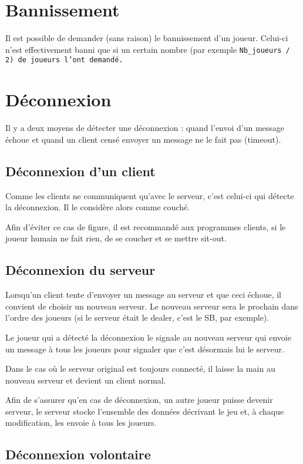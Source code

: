 \documentclass[a4paper]{article}
\begin{document}
\section{Bannissement}

Il est possible de demander (sans raison) le bannissement d'un joueur.
Celui-ci n'est effectivement banni que si un certain nombre (par exemple \tt Nb\_joueurs / 2\rm) de joueurs l'ont demandé.

\section{Déconnexion}

Il y a deux moyens de détecter une déconnexion : quand l'envoi d'un message échoue et quand un client censé envoyer un message ne le fait pas (timeout).

\subsection{Déconnexion d'un client}

Comme les clients ne communiquent qu'avec le serveur, c'est celui-ci qui détecte la déconnexion.
Il le considère alors comme couché.

Afin d'éviter ce cas de figure, il est recommandé aux programmes clients, si le joueur humain ne fait rien, de se coucher et se mettre sit-out.

\subsection{Déconnexion du serveur}

Lorsqu'un client tente d'envoyer un message au serveur et que ceci échoue, il convient de choisir un nouveau serveur.
Le nouveau serveur sera le prochain dans l'ordre des joueurs (si le serveur était le dealer, c'est le SB, par exemple).

Le joueur qui a détecté la déconnexion le signale au nouveau serveur qui envoie un message à tous les joueurs pour signaler que c'est désormais lui le serveur.

Dans le cas où le serveur original est toujours connecté, il laisse la main au nouveau serveur et devient un client normal.

Afin de s'assurer qu'en cas de déconnexion, un autre joueur puisse devenir serveur, le serveur stocke l'ensemble des données décrivant le jeu et, à chaque modification, les envoie à tous les joueurs.

\subsection{Déconnexion volontaire}
\end{document}
